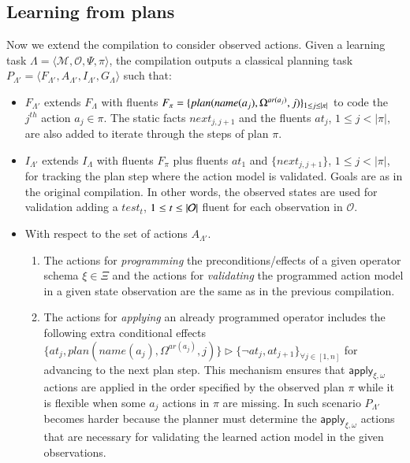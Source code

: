 \documentclass[3p,times]{elsarticle}
\newcommand{\tup}[1]{{\langle #1 \rangle}}
\begin{document}
\subsection{Learning from plans}
Now we extend the compilation to consider observed actions. Given a learning task $\Lambda=\tup{\mathcal{M},\mathcal{O},\Psi,\pi}$, the compilation outputs a classical planning task $P_{\Lambda'}=\tup{F_{\Lambda'},A_{\Lambda'},I_{\Lambda'},G_{\Lambda}}$ such that:
\begin{itemize}
\item $F_{\Lambda'}$ extends $F_{\Lambda}$ with fluents $F_{\pi}=\{plan(name(a_j),\Omega^{ar(a_j)},j)\}_{\small 1\leq j\leq |\pi|}$ to code the $j^{th}$ action $a_j\in\pi$. The static facts $next_{j,j+1}$ and the fluents $at_j$, {\small $1\leq j< |\pi|$}, are also added to iterate through the steps of plan $\pi$.
\item $I_{\Lambda'}$ extends $I_{\Lambda}$ with fluents $F_{\pi}$ plus fluents $at_1$ and $\{next_{j,j+1}\}$, {\small $1\leq j<|\pi|$}, for tracking the plan step where the action model is validated. Goals are as in the original compilation. In other words, the observed states are used for validation adding a $test_t$, ${\small 1\leq t\leq |\mathcal{O}|}$ fluent for each observation in $\mathcal{O}$.
\item With respect to the set of actions $A_{\Lambda'}$.
\begin{enumerate}
\item The actions for {\em programming} the preconditions/effects of a given operator schema $\xi\in\Xi$ and the actions for {\em validating} the programmed action model in a given state observation are the same as in the previous compilation.
\item The actions for {\em applying} an already programmed operator includes the following extra conditional effects $\{at_{j},plan(name(a_j),\Omega^{ar(a_j)},j)\}\rhd\{\neg at_{j},at_{j+1}\}_{\forall j\in [1,n]}$ for advancing to the next plan step. This mechanism ensures that $\mathsf{apply_{\xi,\omega}}$ actions are applied in the order specified by the observed plan $\pi$ while it is flexible when some $a_j$ actions in $\pi$ are missing. In such scenario $P_{\Lambda'}$ becomes harder because the planner must determine the $\mathsf{apply_{\xi,\omega}}$ actions that are necessary for validating the learned action model in the given observations.
\end{enumerate}
\end{itemize}
\end{document}
